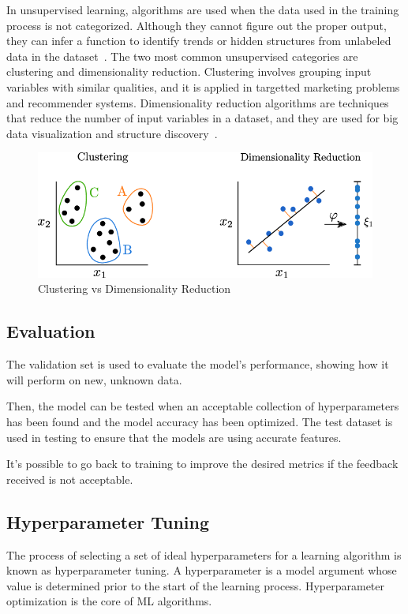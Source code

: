 In unsupervised learning, algorithms are used when the data used in the training process is not categorized. Although they cannot figure out the proper output, they can infer a function to identify trends or hidden structures from unlabeled data in the dataset~\cite{2020WhatExpert.ai}. The two most common unsupervised categories are clustering and dimensionality reduction. Clustering involves grouping input variables with similar qualities, and it is applied in targetted marketing problems and recommender systems. Dimensionality reduction algorithms are techniques that reduce the number of input variables in a dataset, and they are used for big data visualization and structure discovery~\cite{Advani2021WhatUses,Brownlee2020IntroductionLearning}. 

\begin{figure}[htbp]
    \centering
    \includegraphics[width=0.7\linewidth]{Chapters/Figures/clustering_vs_DR.png}
    \caption{Clustering vs Dimensionality Reduction~\cite{Beck2020AModelling}}
    \label{fig:clustering_vs_DR}
\end{figure}

\subsection{Evaluation}

The validation set is used to evaluate the model's performance, showing how it will perform on new, unknown data.

Then, the model can be tested when an acceptable collection of hyperparameters has been found and the model accuracy has been optimized. The test dataset is used in testing to ensure that the models are using accurate features.

It's possible to go back to training to improve the desired metrics if the feedback received is not acceptable.

\subsection{Hyperparameter Tuning}

The process of selecting a set of ideal hyperparameters for a learning algorithm is known as hyperparameter tuning. A hyperparameter is a model argument whose value is determined prior to the start of the learning process. Hyperparameter optimization is the core of \gls{ML} algorithms.

